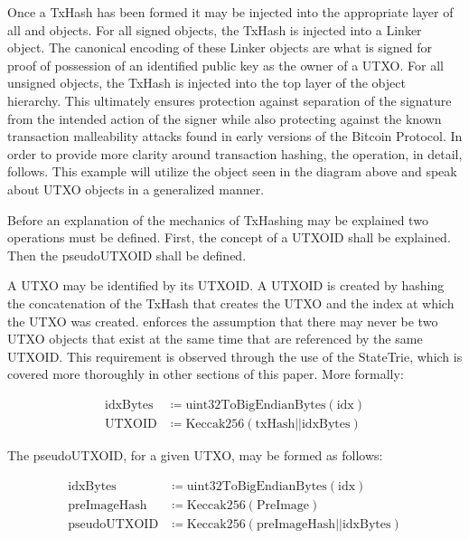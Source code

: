 Once a TxHash has been formed it may be injected into the appropriate layer of
all \Vin{} and \Vout{} objects.
For all signed objects, the TxHash is injected into a Linker object.
The canonical encoding of these Linker objects are what is signed for proof
of possession of an identified public key as the owner of a UTXO.
For all unsigned objects, the TxHash is injected into the top layer of the
object hierarchy.
This ultimately ensures protection against separation of the signature from the
intended action of the signer while also protecting against the known
transaction malleability attacks found in early versions of the Bitcoin
Protocol.
In order to provide more clarity around transaction hashing, the operation, in
detail, follows.
This example will utilize the \TxIn{} object seen in the diagram above and speak
about UTXO objects in a generalized manner.

Before an explanation of the mechanics of TxHashing may be explained two
operations must be defined.
First, the concept of a UTXOID shall be explained.
Then the pseudoUTXOID shall be defined.

A UTXO may be identified by its UTXOID.
A UTXOID is created by hashing the concatenation of the TxHash that creates the
UTXO and the \Vout{} index at which the UTXO was created.
\LayerTwo{} enforces the assumption that there may never be two UTXO objects
that exist at the same time that are referenced by the same UTXOID.
This requirement is observed through the use of the StateTrie, which is covered
more thoroughly in other sections of this paper.
More formally:

\begin{align*}
    \text{idxBytes} &\coloneqq \text{uint32ToBigEndianBytes}(\text{idx}) \\
    \text{UTXOID} &\coloneqq \text{Keccak256}(\text{txHash}||\text{idxBytes})
\end{align*}

\noindent
The pseudoUTXOID, for a given UTXO, may be formed as follows:

\begin{align*}
    \text{idxBytes} &\coloneqq \text{uint32ToBigEndianBytes}(\text{idx}) \\
    \text{preImageHash} &\coloneqq \text{Keccak256}(\text{PreImage}) \\
    \text{pseudoUTXOID} &\coloneqq \text{Keccak256}(\text{preImageHash} ||
        \text{idxBytes})
\end{align*}

